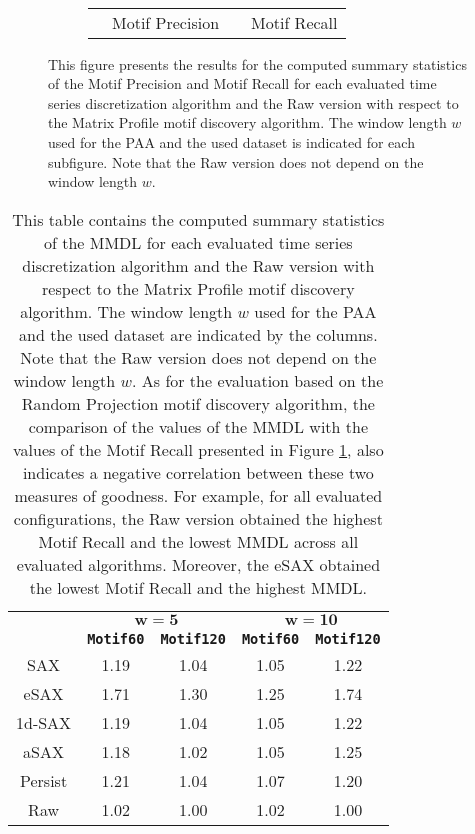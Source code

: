 \begin{figure}[H]
\\[10pt]
\begin{subfigure}[t]{0.5\textwidth}
\centering
\begin{tabular}{cccc}
\cellcolor[HTML]{4682B4} & Motif Precision & \cellcolor[HTML]{FFA500} & Motif Recall \\
\end{tabular}
\end{subfigure}
\caption[Evaluation - Motif Precision \& Motif Recall for the Matrix Profile]{This figure presents the results for the computed summary statistics of the Motif Precision and Motif Recall for each evaluated time series discretization algorithm and the Raw version with respect to the Matrix Profile motif discovery algorithm. The window length $w$ used for the \ac{PAA} and the used dataset is indicated for each subfigure. Note that the Raw version does not depend on the window length $w$.}
\label{fig:results_matrix_profile}
\end{figure}
\begin{table}[htb]
\centering
\begin{tabular}{ccccc} 
\toprule
& \multicolumn{2}{c}{$\mathbf{w = 5}$} & \multicolumn{2}{c}{$\mathbf{w = 10}$} \\
\cmidrule(lr){2-3} \cmidrule(lr){4-5}
& \texttt{\textbf{Motif60}} & \texttt{\textbf{Motif120}} & \texttt{\textbf{Motif60}} & \texttt{\textbf{Motif120}} \\
\midrule
\ac{SAX} & 1.19 & 1.04 & 1.05 & 1.22 \\
\ac{eSAX} & 1.71 & 1.30 & 1.25 & 1.74 \\
\ac{1d-SAX} & 1.19 & 1.04 & 1.05 & 1.22 \\
\ac{aSAX} & 1.18 & 1.02 & 1.05 & 1.25 \\
Persist & 1.21 & 1.04 & 1.07 & 1.20 \\
Raw & 1.02 & 1.00 & 1.02 & 1.00 \\
\bottomrule
\end{tabular}
\vspace*{0.5cm}
\caption[Evaluation - MMDL for the Matrix Profile]{This table contains the computed summary statistics of the \ac{MMDL} for each evaluated time series discretization algorithm and the Raw version with respect to the Matrix Profile motif discovery algorithm. The window length $w$ used for the \ac{PAA} and the used dataset are indicated by the columns. Note that the Raw version does not depend on the window length $w$. As for the evaluation based on the Random Projection motif discovery algorithm, the comparison of the values of the \ac{MMDL} with the values of the Motif Recall presented in Figure \ref{fig:results_matrix_profile}, also indicates a negative correlation between these two measures of goodness. For example, for all evaluated configurations, the Raw version obtained the highest Motif Recall and the lowest \ac{MMDL} across all evaluated algorithms. Moreover, the \ac{eSAX} obtained the lowest Motif Recall and the highest \ac{MMDL}.}
\label{tab:mmdl_matrix_profile}
\end{table}
